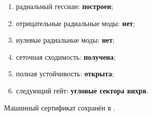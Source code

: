 \begin{protocol}
\begin{enumerate}
 \item радиальный гессиан: \textbf{построен};
 \item отрицательные радиальные моды: \textbf{нет};
 \item нулевые радиальные моды: \textbf{нет};
 \item сеточная сходимость: \textbf{получена};
 \item полная устойчивость: \textbf{открыта};
 \item следующий гейт: \textbf{угловые сектора вихря}.
\end{enumerate}
\end{protocol}

Машинный сертификат сохранён в
.